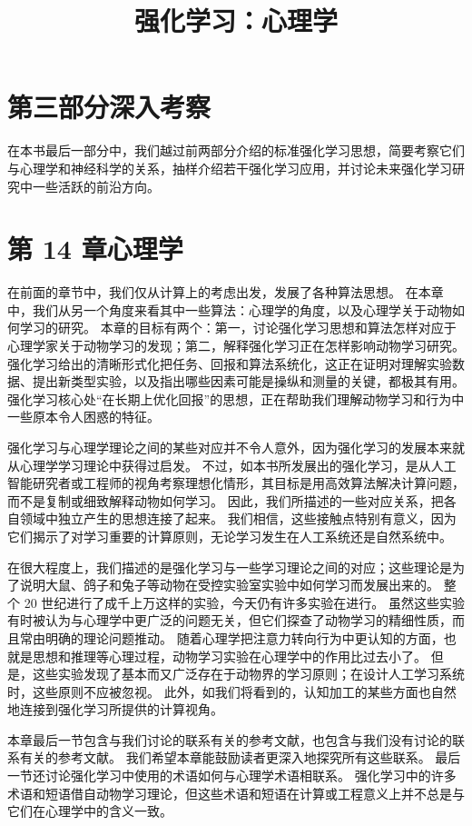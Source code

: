 \documentclass[UTF8, 12pt, fontset=fandol, oneside]{ctexart}
\title{强化学习：心理学}
\author{}
\date{}
\begin{document}
\maketitle

\section*{第三部分\quad 深入考察}

在本书最后一部分中，我们越过前两部分介绍的标准强化学习思想，简要考察它们与心理学和神经科学的关系，抽样介绍若干强化学习应用，并讨论未来强化学习研究中一些活跃的前沿方向。

\section*{第 14 章\quad 心理学}

在前面的章节中，我们仅从计算上的考虑出发，发展了各种算法思想。
在本章中，我们从另一个角度来看其中一些算法：心理学的角度，以及心理学关于动物如何学习的研究。
本章的目标有两个：第一，讨论强化学习思想和算法怎样对应于心理学家关于动物学习的发现；第二，解释强化学习正在怎样影响动物学习研究。
强化学习给出的清晰形式化把任务、回报和算法系统化，这正在证明对理解实验数据、提出新类型实验，以及指出哪些因素可能是操纵和测量的关键，都极其有用。
强化学习核心处“在长期上优化回报”的思想，正在帮助我们理解动物学习和行为中一些原本令人困惑的特征。

强化学习与心理学理论之间的某些对应并不令人意外，因为强化学习的发展本来就从心理学学习理论中获得过启发。
不过，如本书所发展出的强化学习，是从人工智能研究者或工程师的视角考察理想化情形，其目标是用高效算法解决计算问题，而不是复制或细致解释动物如何学习。
因此，我们所描述的一些对应关系，把各自领域中独立产生的思想连接了起来。
我们相信，这些接触点特别有意义，因为它们揭示了对学习重要的计算原则，无论学习发生在人工系统还是自然系统中。

在很大程度上，我们描述的是强化学习与一些学习理论之间的对应；这些理论是为了说明大鼠、鸽子和兔子等动物在受控实验室实验中如何学习而发展出来的。
整个 20 世纪进行了成千上万这样的实验，今天仍有许多实验在进行。
虽然这些实验有时被认为与心理学中更广泛的问题无关，但它们探查了动物学习的精细性质，而且常由明确的理论问题推动。
随着心理学把注意力转向行为中更认知的方面，也就是思想和推理等心理过程，动物学习实验在心理学中的作用比过去小了。
但是，这些实验发现了基本而又广泛存在于动物界的学习原则；在设计人工学习系统时，这些原则不应被忽视。
此外，如我们将看到的，认知加工的某些方面也自然地连接到强化学习所提供的计算视角。

本章最后一节包含与我们讨论的联系有关的参考文献，也包含与我们没有讨论的联系有关的参考文献。
我们希望本章能鼓励读者更深入地探究所有这些联系。
最后一节还讨论强化学习中使用的术语如何与心理学术语相联系。
强化学习中的许多术语和短语借自动物学习理论，但这些术语和短语在计算或工程意义上并不总是与它们在心理学中的含义一致。
\end{document}
